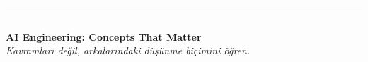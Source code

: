 \vfill
\begin{center}
\textcolor{accent}{\rule{30mm}{2pt}}\\[4pt]
{\sffamily\bfseries\small\color{accentdk}AI Engineering: Concepts That Matter}\\[1pt]
{\color{softgray}\itshape\footnotesize Kavramları değil, arkalarındaki düşünme biçimini öğren.}
\end{center}
\vspace{6mm}
